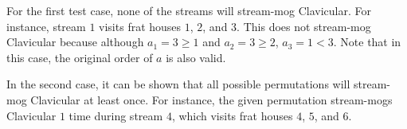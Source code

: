 For the first test case, none of the streams will stream-mog Clavicular.
For instance, stream $1$ visits frat houses $1$, $2$, and $3$.
This does not stream-mog Clavicular because although $a_1 = 3 \geq 1$
and $a_2 = 3 \geq 2$, $a_3 = 1 < 3$.
Note that in this case, the original order of $a$ is also valid.

In the second case, it can be shown that all possible permutations
will stream-mog Clavicular at least once. For instance,
the given permutation stream-mogs Clavicular $1$ time during stream $4$,
which visits frat houses $4$, $5$, and $6$.
